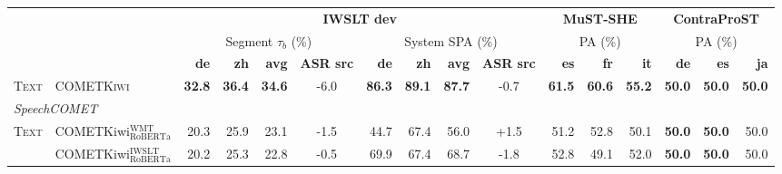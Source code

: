 \begin{table}[t]
\centering
\footnotesize
\setlength{\tabcolsep}{3pt}
\begin{tabular}{ll|rrrc|rrrc|rrr|rrr}
\toprule
 & & \multicolumn{8}{c|}{\textbf{IWSLT dev}} & \multicolumn{3}{c|}{\textbf{MuST-SHE}} & \multicolumn{3}{c}{\textbf{ContraProST}} \\
 & & \multicolumn{4}{c|}{Segment $\tau_b$ (\%)} & \multicolumn{4}{c|}{System SPA (\%)} & \multicolumn{3}{c|}{PA (\%)} & \multicolumn{3}{c}{PA (\%)} \\
\cmidrule(lr){3-6}\cmidrule(lr){7-10}\cmidrule(lr){11-13}\cmidrule(lr){14-16}
 & & \textbf{de} & \textbf{zh} & \textbf{avg} & \multicolumn{1}{c|}{\textbf{ASR src}} & \textbf{de} & \textbf{zh} & \textbf{avg} & \multicolumn{1}{c|}{\textbf{ASR src}} & \textbf{es} & \textbf{fr} & \textbf{it} & \textbf{de} & \textbf{es} & \textbf{ja} \\
\midrule
\textsc{Text} & \textsc{COMETKiwi} & \cellcolor[RGB]{205,233,233}\textbf{32.8} & \cellcolor[RGB]{224,241,241}\textbf{36.4} & \cellcolor[RGB]{217,238,238}\textbf{34.6} & \cellcolor[RGB]{246,249,252}\scriptsize{-6.0} & \cellcolor[RGB]{196,229,229}\textbf{86.3} & \cellcolor[RGB]{183,224,223}\textbf{89.1} & \cellcolor[RGB]{185,225,224}\textbf{87.7} & \cellcolor[RGB]{208,224,240}\scriptsize{-0.7} & \cellcolor[RGB]{250,183,132}\textbf{61.5} & \cellcolor[RGB]{250,183,132}\textbf{60.6} & \cellcolor[RGB]{250,183,132}\textbf{55.2} & \cellcolor[RGB]{255,255,255}\textbf{50.0} & \cellcolor[RGB]{255,255,255}\textbf{50.0} & \cellcolor[RGB]{255,255,255}\textbf{50.0} \\
\midrule
\multicolumn{16}{l}{\textit{SpeechCOMET}} \\
\midrule
\multirow{2}{*}{\textsc{Text}} & COMETKiwi$_{\text{RoBERTa}}^{\text{WMT}}$ & \cellcolor[RGB]{244,250,250}20.3 & \cellcolor[RGB]{242,249,249}25.9 & \cellcolor[RGB]{243,249,249}23.1 & \cellcolor[RGB]{214,228,242}\scriptsize{-1.5} & \cellcolor[RGB]{255,255,255}44.7 & \cellcolor[RGB]{211,236,235}67.4 & \cellcolor[RGB]{255,255,255}56.0 & \cellcolor[RGB]{192,214,235}\scriptsize{+1.5} & \cellcolor[RGB]{254,247,242}51.2 & \cellcolor[RGB]{253,236,222}52.8 & \cellcolor[RGB]{254,253,252}50.1 & \cellcolor[RGB]{255,255,255}\textbf{50.0} & \cellcolor[RGB]{255,255,255}\textbf{50.0} & \cellcolor[RGB]{255,255,255}50.0 \\
 & COMETKiwi$_{\text{RoBERTa}}^{\text{IWSLT}}$ & \cellcolor[RGB]{244,250,250}20.2 & \cellcolor[RGB]{243,250,250}25.3 & \cellcolor[RGB]{243,250,250}22.8 & \cellcolor[RGB]{206,223,239}\scriptsize{-0.5} & \cellcolor[RGB]{219,239,239}69.9 & \cellcolor[RGB]{211,236,235}67.4 & \cellcolor[RGB]{227,243,242}68.7 & \cellcolor[RGB]{216,229,242}\scriptsize{-1.8} & \cellcolor[RGB]{253,237,225}52.8 & \cellcolor[RGB]{255,255,255}49.1 & \cellcolor[RGB]{253,227,207}52.0 & \cellcolor[RGB]{255,255,255}\textbf{50.0} & \cellcolor[RGB]{255,255,255}\textbf{50.0} & \cellcolor[RGB]{255,255,255}50.0 \\

\end{tabular}
\end{table}
